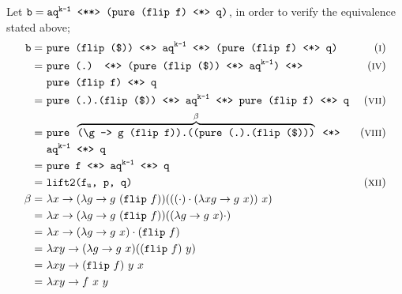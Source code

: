 Let $\texttt{b} = \texttt{aq}^\texttt{k-1}\texttt{ \pa (pure (flip f) \ap q)}$, in order to verify the equivalence stated above;
\begin{align*}
    \texttt{b} =\ & \texttt{pure (flip (\$)) \ap aq}^\texttt{k-1}\texttt{ \ap (pure (flip f) \ap q)} & \equi[1] \\
    =\ & \texttt{pure (.) \ap (pure (flip (\$)) \ap aq}^\texttt{k-1}\texttt{) \ap} & \equi[4] \\
    & \texttt{pure (flip f) \ap q} \\
    =\ & \texttt{pure (.).(flip (\$)) \ap aq}^\texttt{k-1}\texttt{ \ap pure (flip f) \ap q} & \equi[7] \\
    =\ & \texttt{pure }\overbrace{\texttt{(\textbackslash g -> g (flip f)).((pure (.).(flip (\$)))}}^{\beta}\texttt{ \ap} & \equi[8] \\
    & \texttt{aq}^\texttt{k-1}\texttt{ \ap q} \\
    =\ & \texttt{pure f \ap aq}^\texttt{k-1}\texttt{ \ap q} \\
    =\ & \texttt{lift2(f}_\texttt{u}\texttt{, p, q)} & \equi[12] \\
    \beta =\ & \lambda x \to (\lambda g \to g\ (\texttt{flip}\ f))(((\cdot) \cdot (\lambda xg \to g\ x))\ x) \\
    =\ & \lambda x \to (\lambda g \to g\ (\texttt{flip}\ f))((\lambda g \to g\ x) \cdot) \\
    =\ & \lambda x \to (\lambda g \to g\ x) \cdot (\texttt{flip}\ f) \\
    =\ & \lambda xy \to (\lambda g \to g\ x) ((\texttt{flip}\ f)\ y) \\
    =\ & \lambda xy \to (\texttt{flip}\ f)\ y\ x \\
    =\ & \lambda xy \to f\ x\ y
\end{align*}

